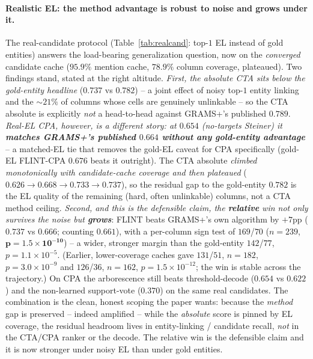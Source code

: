\paragraph{Realistic EL: the method advantage is robust to noise and grows under it.}
The real-candidate protocol (Table~\ref{tab:realcand}: top-$1$ EL instead of gold
entities) answers the load-bearing generalization question, now on the
\emph{converged} candidate cache ($95.9\%$ mention cache, $78.9\%$ column coverage,
plateaued). Two findings stand, stated at the right altitude. \emph{First, the
absolute CTA sits below the gold-entity headline} ($0.737$ vs $0.782$) -- a joint effect
of noisy top-$1$ entity linking and the $\sim$$21\%$ of columns whose cells are
genuinely unlinkable -- so the CTA absolute is explicitly \emph{not} a head-to-head
against GRAMS+'s published $0.789$. \emph{Real-EL CPA, however, is a different story: at
$0.654$ (no-targets Steiner) it \textbf{matches GRAMS+'s published $0.664$ without any
gold-entity advantage}} -- a matched-EL tie that removes the gold-EL caveat for CPA
specifically (gold-EL FLINT-CPA $0.676$ beats it outright). The CTA absolute \emph{climbed
monotonically with candidate-cache coverage and then plateaued}
($0.626\!\to\!0.668\!\to\!0.733\!\to\!0.737$), so the residual gap to the gold-entity
$0.782$ is the EL quality of the remaining (hard, often unlinkable) columns, not a CTA
method ceiling. \emph{Second, and this is the defensible claim, the \textbf{relative}
win not only survives the noise but \textbf{grows}}: FLINT beats GRAMS+'s own algorithm
by $+7$pp ($0.737$ vs $0.666$; counting $0.661$), with a per-column sign test of
$169$/$70$ ($n{=}239$, $\mathbf{p{=}1.5\times10^{-10}}$) -- a wider, stronger margin
than the gold-entity $142$/$77$, $p{=}1.1\times10^{-5}$. (Earlier, lower-coverage caches
gave $131$/$51$, $n{=}182$, $p{=}3.0\times10^{-9}$ and $126$/$36$, $n{=}162$,
$p{=}1.5\times10^{-12}$; the win is stable across the trajectory.) On CPA the
arborescence still beats threshold-decode ($0.654$ vs $0.622$) and the non-learned
support-vote ($0.370$) on the same real candidates. The combination is the clean,
honest scoping the paper wants: because the \emph{method} gap is preserved -- indeed
amplified -- while the \emph{absolute} score is pinned by EL coverage, the residual
headroom lives in entity-linking / candidate recall, \emph{not} in the CTA/CPA ranker
or the decode. The relative win is the defensible claim and it is now stronger under
noisy EL than under gold entities.

